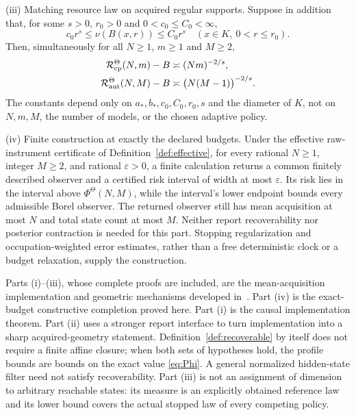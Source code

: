 \begin{theorem}
\smallskip\noindent\textup{(iii) Matching resource law on acquired regular supports.}
Suppose in addition that, for some $s>0$, $r_0>0$ and $0<c_0\le C_0<\infty$,
\begin{equation}\label{eq:regularity}
 c_0r^s\le\nu(B(x,r))\le C_0r^s
 \quad(x\in K,\ 0<r\le r_0).
\end{equation}
Then, simultaneously for all $N\ge1$, $m\ge1$ and $M\ge2$,
\begin{align}
 \mathcal R_{\mathrm{cp}}^\Theta(N,m)-B&\asymp (Nm)^{-2/s},\label{eq:regular-cp}\\
 \mathcal R_{\mathrm{aut}}^\Theta(N,M)-B&\asymp \bigl(N(M-1)\bigr)^{-2/s}.\label{eq:regular-aut}
\end{align}
The constants depend only on $a_*,b_*,c_0,C_0,r_0,s$ and the diameter of $K$, not on $N,m,M$, the number of models, or the chosen adaptive policy.

\smallskip\noindent\textup{(iv) Finite construction at exactly the declared budgets.}
Under the effective raw-instrument certificate of Definition~\ref{def:effective}, for every rational $N\ge1$, integer $M\ge2$, and rational $\varepsilon>0$, a finite calculation returns a common finitely described observer and a certified risk interval of width at most $\varepsilon$. Its risk lies in the interval above $\Phi^\Theta(N,M)$, while the interval's lower endpoint bounds every admissible Borel observer. The returned observer still has mean acquisition at most $N$ and total state count at most $M$. Neither report recoverability nor posterior contraction is needed for this part. Stopping regularization and occupation-weighted error estimates, rather than a free deterministic clock or a budget relaxation, supply the construction.
\end{theorem}

Parts (i)--(iii), whose complete proofs are included, are the mean-acquisition implementation and geometric mechanisms developed in~\cite{GTFMean}. Part (iv) is the exact-budget constructive completion proved here. Part (i) is the causal implementation theorem. Part (ii) uses a stronger report interface to turn implementation into a sharp acquired-geometry statement. Definition~\ref{def:recoverable} by itself does not require a finite affine closure; when both sets of hypotheses hold, the profile bounds are bounds on the exact value \eqref{eq:Phi}. A general normalized hidden-state filter need not satisfy recoverability. Part (iii) is not an assignment of dimension to arbitrary reachable states: its measure is an explicitly obtained reference law and its lower bound covers the actual stopped law of every competing policy.

